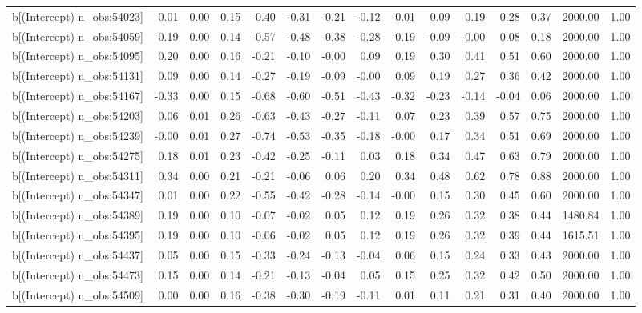 \begin{table}[ht]
\begin{tabular}{rrrrrrrrrrrrrrr}
  b[(Intercept) n\_obs:54023] & -0.01 & 0.00 & 0.15 & -0.40 & -0.31 & -0.21 & -0.12 & -0.01 & 0.09 & 0.19 & 0.28 & 0.37 & 2000.00 & 1.00 \\ 
  b[(Intercept) n\_obs:54059] & -0.19 & 0.00 & 0.14 & -0.57 & -0.48 & -0.38 & -0.28 & -0.19 & -0.09 & -0.00 & 0.08 & 0.18 & 2000.00 & 1.00 \\ 
  b[(Intercept) n\_obs:54095] & 0.20 & 0.00 & 0.16 & -0.21 & -0.10 & -0.00 & 0.09 & 0.19 & 0.30 & 0.41 & 0.51 & 0.60 & 2000.00 & 1.00 \\ 
  b[(Intercept) n\_obs:54131] & 0.09 & 0.00 & 0.14 & -0.27 & -0.19 & -0.09 & -0.00 & 0.09 & 0.19 & 0.27 & 0.36 & 0.42 & 2000.00 & 1.00 \\ 
  b[(Intercept) n\_obs:54167] & -0.33 & 0.00 & 0.15 & -0.68 & -0.60 & -0.51 & -0.43 & -0.32 & -0.23 & -0.14 & -0.04 & 0.06 & 2000.00 & 1.00 \\ 
  b[(Intercept) n\_obs:54203] & 0.06 & 0.01 & 0.26 & -0.63 & -0.43 & -0.27 & -0.11 & 0.07 & 0.23 & 0.39 & 0.57 & 0.75 & 2000.00 & 1.00 \\ 
  b[(Intercept) n\_obs:54239] & -0.00 & 0.01 & 0.27 & -0.74 & -0.53 & -0.35 & -0.18 & -0.00 & 0.17 & 0.34 & 0.51 & 0.69 & 2000.00 & 1.00 \\ 
  b[(Intercept) n\_obs:54275] & 0.18 & 0.01 & 0.23 & -0.42 & -0.25 & -0.11 & 0.03 & 0.18 & 0.34 & 0.47 & 0.63 & 0.79 & 2000.00 & 1.00 \\ 
  b[(Intercept) n\_obs:54311] & 0.34 & 0.00 & 0.21 & -0.21 & -0.06 & 0.06 & 0.20 & 0.34 & 0.48 & 0.62 & 0.78 & 0.88 & 2000.00 & 1.00 \\ 
  b[(Intercept) n\_obs:54347] & 0.01 & 0.00 & 0.22 & -0.55 & -0.42 & -0.28 & -0.14 & -0.00 & 0.15 & 0.30 & 0.45 & 0.60 & 2000.00 & 1.00 \\ 
  b[(Intercept) n\_obs:54389] & 0.19 & 0.00 & 0.10 & -0.07 & -0.02 & 0.05 & 0.12 & 0.19 & 0.26 & 0.32 & 0.38 & 0.44 & 1480.84 & 1.00 \\ 
  b[(Intercept) n\_obs:54395] & 0.19 & 0.00 & 0.10 & -0.06 & -0.02 & 0.05 & 0.12 & 0.19 & 0.26 & 0.32 & 0.39 & 0.44 & 1615.51 & 1.00 \\ 
  b[(Intercept) n\_obs:54437] & 0.05 & 0.00 & 0.15 & -0.33 & -0.24 & -0.13 & -0.04 & 0.06 & 0.15 & 0.24 & 0.33 & 0.43 & 2000.00 & 1.00 \\ 
  b[(Intercept) n\_obs:54473] & 0.15 & 0.00 & 0.14 & -0.21 & -0.13 & -0.04 & 0.05 & 0.15 & 0.25 & 0.32 & 0.42 & 0.50 & 2000.00 & 1.00 \\ 
  b[(Intercept) n\_obs:54509] & 0.00 & 0.00 & 0.16 & -0.38 & -0.30 & -0.19 & -0.11 & 0.01 & 0.11 & 0.21 & 0.31 & 0.40 & 2000.00 & 1.00 \\ 

\end{tabular}
\end{table}
